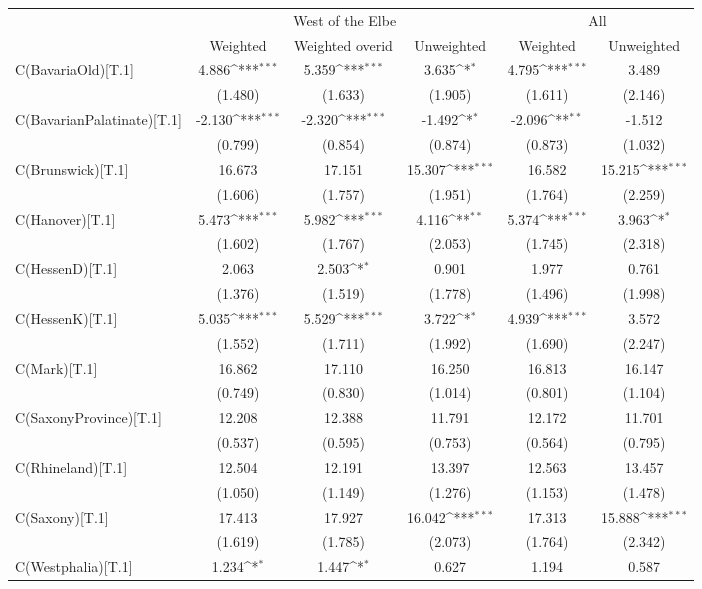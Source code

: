 {
\def\sym#1{\ifmmode^{#1}\else\(^{#1}\)\fi}
\begin{tabular}{@{\extracolsep{2pt}}l*{5}{c}@{}}
\hline\hline
& \multicolumn{3}{c}{West of the Elbe} & \multicolumn{2}{c}{All} \\
\cline{2-4}
\cline{5-6}
 & Weighted & Weighted overid & Unweighted & Weighted & Unweighted \\
\hline
C(BavariaOld)[T.1] & 4.886\sym{***} & 5.359\sym{***} & 3.635\sym{*} & 4.795\sym{***} & 3.489 \\
 & (1.480) & (1.633) & (1.905) & (1.611) & (2.146) \\
C(BavarianPalatinate)[T.1] & -2.130\sym{***} & -2.320\sym{***} & -1.492\sym{*} & -2.096\sym{**} & -1.512 \\
 & (0.799) & (0.854) & (0.874) & (0.873) & (1.032) \\
C(Brunswick)[T.1] & 16.673 & 17.151 & 15.307\sym{***} & 16.582 & 15.215\sym{***} \\
 & (1.606) & (1.757) & (1.951) & (1.764) & (2.259) \\
C(Hanover)[T.1] & 5.473\sym{***} & 5.982\sym{***} & 4.116\sym{**} & 5.374\sym{***} & 3.963\sym{*} \\
 & (1.602) & (1.767) & (2.053) & (1.745) & (2.318) \\
C(HessenD)[T.1] & 2.063 & 2.503\sym{*} & 0.901 & 1.977 & 0.761 \\
 & (1.376) & (1.519) & (1.778) & (1.496) & (1.998) \\
C(HessenK)[T.1] & 5.035\sym{***} & 5.529\sym{***} & 3.722\sym{*} & 4.939\sym{***} & 3.572 \\
 & (1.552) & (1.711) & (1.992) & (1.690) & (2.247) \\
C(Mark)[T.1] & 16.862 & 17.110 & 16.250 & 16.813 & 16.147 \\
 & (0.749) & (0.830) & (1.014) & (0.801) & (1.104) \\
C(SaxonyProvince)[T.1] & 12.208 & 12.388 & 11.791 & 12.172 & 11.701 \\
 & (0.537) & (0.595) & (0.753) & (0.564) & (0.795) \\
C(Rhineland)[T.1] & 12.504 & 12.191 & 13.397 & 12.563 & 13.457 \\
 & (1.050) & (1.149) & (1.276) & (1.153) & (1.478) \\
C(Saxony)[T.1] & 17.413 & 17.927 & 16.042\sym{***} & 17.313 & 15.888\sym{***} \\
 & (1.619) & (1.785) & (2.073) & (1.764) & (2.342) \\
C(Westphalia)[T.1] & 1.234\sym{*} & 1.447\sym{*} & 0.627 & 1.194 & 0.587 \\

\end{tabular}}
